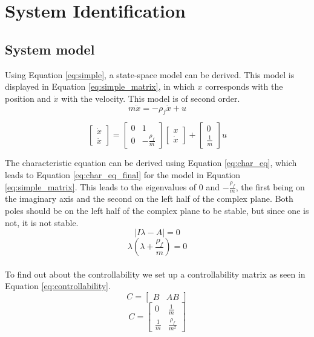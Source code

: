 \documentclass[final]{scrreprt} %
\begin{document}
\chapter{System Identification}

\section*{System model}
Using Equation \ref{eq:simple}, a state-space model can be derived.
This model is displayed in Equation \ref{eq:simple_matrix}, in which $x$ corresponds with the position and $\dot{x}$ with the velocity.
This model is of second order.
\begin{equation}
	m \ddot{x} = -\rho_f \dot{x} + u
	\label{eq:simple}
\end{equation}

\begin{equation}
	\begin{bmatrix}
		\dot{x} \\
		\ddot{x}
	\end{bmatrix} =
	\begin{bmatrix}
		0 & 1 \\
		0 & -\frac{\rho_f}{m}
	\end{bmatrix}
	\begin{bmatrix}
		x \\
		\dot{x}
	\end{bmatrix} +
	\begin{bmatrix}
		0 \\
		\frac{1}{m}
	\end{bmatrix}
	u
	\label{eq:simple_matrix}
\end{equation}

The characteristic equation can be derived using Equation \ref{eq:char_eq}, which leads to Equation \ref{eq:char_eq_final} for the model in Equation \ref{eq:simple_matrix}.
This leads to the eigenvalues of $0$ and $-\frac{\rho_f}{m}$, the first being on the imaginary axis and the second on the left half of the complex plane.
Both poles should be on the left half of the complex plane to be stable, but since one is not, it is not stable.
\\
\begin{equation}
	\left| I \lambda - A \right| = 0
	\label{eq:char_eq}
\end{equation}
\begin{equation}
	\lambda(\lambda + \frac{\rho_f}{m}) = 0
	\label{eq:char_eq_final}
\end{equation}
\\
To find out about the controllability we set up a controllability matrix as seen in Equation \ref{eq:controllability}.
\begin{equation}
C =
\begin{bmatrix}
B & AB
\end{bmatrix}
\end{equation}
\begin{equation}
C =
\begin{bmatrix}
0 & \frac{1}{m}\\
\frac{1}{m} & \frac{\rho_f}{m^2}
\end{bmatrix}\label{eq:controllability}
\end{equation}
\end{document}

